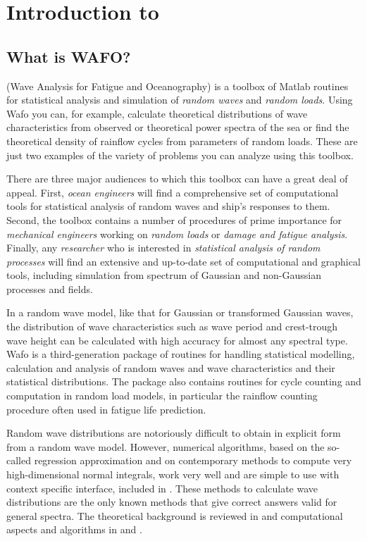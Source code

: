 %
\chapter{Introduction to \progname{}}\label{cha:introduction}\label{cha:1}

\section{What is WAFO?}\label{sec:whatiswafo}
\progname{} (Wave Analysis for Fatigue and Oceanography) is a toolbox of
Matlab routines for statistical analysis and simulation of {\em random
waves} and {\em random loads}. Using {\sc Wafo} you can, for example,
calculate theoretical distributions of wave characteristics from
observed or theoretical power spectra of the sea or find the
theoretical density of rainflow cycles from parameters of random loads. 
These are just two examples of the variety of problems you can analyze
using this toolbox.

There are three major audiences to which this toolbox can have a great
deal of appeal. First, {\em ocean engineers} will find a comprehensive
set of computational tools for statistical analysis of random waves and
ship's responses to them. Second, the toolbox contains a number of
procedures of prime importance for {\em mechanical engineers}
working on {\em random loads} or {\em damage and
fatigue analysis}.  Finally, any {\em researcher} who is interested in
{\em statistical analysis of random processes} will find an
extensive and up-to-date set of computational and graphical tools, 
including simulation from spectrum of Gaussian and non-Gaussian 
processes and fields. 

In a random wave model, like that for Gaussian or transformed
Gaussian waves, the distribution of wave characteristics such as wave
period and crest-trough wave height can be calculated with high
accuracy for almost any spectral type. {\sc Wafo} is a third-generation
package of \ML{} routines for handling statistical modelling,
calculation and analysis of random waves and wave characteristics and
their statistical distributions. The package also contains routines
for cycle counting and computation in random load models, in
particular the rainflow counting procedure often used in fatigue life
prediction.

Random wave distributions are notoriously difficult to obtain in
explicit form from a random wave model. 
However, numerical algorithms,
based on the so-called regression approximation and on contemporary 
methods to compute very high-dimensional normal integrals, work very well 
and are simple to use with context specific interface, included in \wf{}. 
These
methods to calculate wave distributions are the only known methods that
give correct answers valid for general spectra. The theoretical
background is reviewed in \cite{LindgrenAndRychlik1991Slepian}
and computational aspects and algorithms in
\cite{RychlikAndLindgren1993Crossreg} and 
\cite{Brodtkorb2006Evaluating,PodgorskiEtal2000Exact}. 

